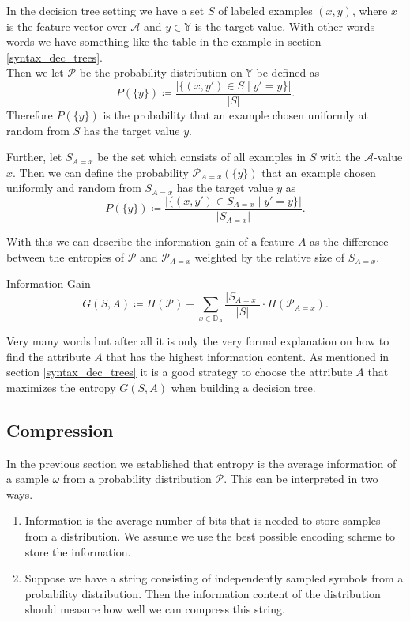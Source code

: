 \documentclass{panikzettel}
\begin{document}
In the decision tree setting we have a set $S$ of labeled examples $(x,y)$, where $x$ is the feature vector over $\mathcal{A}$ and $y\in\mathbb{Y}$ is the target value. With other words words we have something like the table in the example in section \ref{syntax_dec_trees}.\\
Then we let $\mathcal{P}$ be the probability distribution  on $\mathbb{Y}$ be defined  as
\[
P(\{y \})\coloneqq \frac{|\{(x,y')\in S \mid y'=y \}|}{|S|}.
\]
Therefore $P(\{y \})$ is the probability that an example chosen uniformly at random from $S$ has the target value $y$.

Further, let $S_{A=x}$ be the set which consists of all examples in $S$ with the $\mathcal{A}$-value $x$. Then we can define the probability $\mathcal{P}_{A=x}(\{y\})$ that an example chosen uniformly and random from $S_{A=x}$ has the target value $y$ as
\[
P(\{y \})\coloneqq \frac{|\{(x,y')\in S_{A=x} \mid y'=y \}|}{|S_{A=x}|}.
\]

\begin{halfboxl}
\vspace{-\baselineskip}
	With this we can describe the information gain of a feature $A$ as the difference between the entropies of $\mathcal{P}$ and $\mathcal{P}_{A=x}$ weighted by the relative size of $S_{A=x}$.
\end{halfboxl}
\begin{halfboxr}
\vspace{-\baselineskip}
	\begin{defi}{Information Gain}
	\[
	G(S,A)\coloneqq H(\mathcal{P}) -\sum_{x\in\mathbb{D}_A}\frac{|S_{A=x}|}{|S|}\cdot H(\mathcal{P}_{A=x}).
	\]
	\end{defi}
\end{halfboxr}

Very many words but after all it is only the very formal explanation on how to find the attribute $A$ that has the highest information content. As mentioned in section \ref{syntax_dec_trees} it is a good strategy to choose the attribute $A$ that maximizes the entropy $G(S,A)$ when building a decision tree.

\subsection{Compression}
In the previous section we established that entropy is the average information of a sample $\omega$ from a probability distribution $\mathcal{P}$. This can be interpreted in two ways.
\begin{enumerate}
\item Information is the average number of bits that is needed to store samples from a distribution. We assume we use the best possible encoding scheme to store the information.
\item Suppose we have a string consisting of independently sampled symbols from a probability distribution. Then the information content of the distribution should measure how well we can compress this string.
\end{enumerate}
\end{document}

